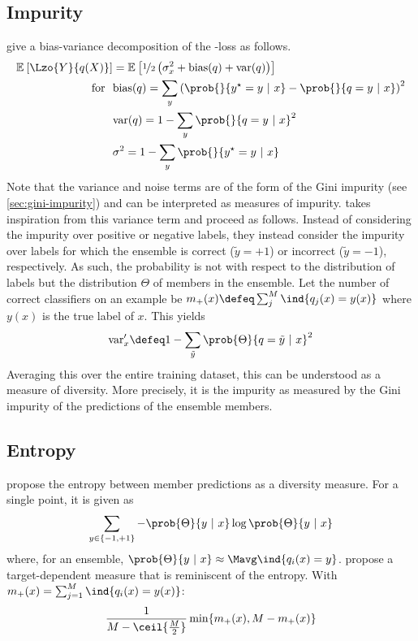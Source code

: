 \documentclass[../main.tex]{subfiles}
\begin{document}
\subsection{Impurity} 
\citeauthor{kohavi_BiasVarianceDecomposition_} \cite{kohavi_BiasVarianceDecomposition_} give a bias-variance decomposition of the \zeroone-loss as follows.
$$
\begin{align}
\mathbb{E}_{}\left[ \Lzo{Y}{q(X)} \right] &= 
\mathbb{E}_{}\left[  
\nicefrac{1}{2}\left( \sigma^2_{x} + \text{bias}(q) + \text{var}(q)   \right)
\right] \\
\text{for} ~ ~ & \text{bias}(q) =  \sum_{y} \left(  \prob{}{y^\star = y ~|~x} - \prob{}{q=y ~|~ x} \right)^2 \\
& \text{var}(q) = 1 - \sum_{y} \prob{}{q=y ~|~x}^2  \\
& \sigma^2 = 1 - \sum_{y} \prob{}{y^\star = y ~|~ x}
\end{align}
$$
Note that the variance and noise terms are of the form of the Gini impurity (see \ref{sec:gini-impurity}) and can be interpreted as measures of impurity.
\citeauthor{kuncheva_MeasuresDiversityClassifier_2003} \cite{kuncheva_MeasuresDiversityClassifier_2003} takes inspiration from this variance term and proceed as follows. Instead of considering the impurity over positive or negative labels, they instead consider the impurity over labels for which the ensemble is correct ($\tilde{y} = +1$) or incorrect ($\tilde{y} = -1$), respectively. As such, the probability is not with respect to the distribution of labels but the distribution $\Theta$ of members in the ensemble. Let the number of correct classifiers on an example be $m_{+}(x) \defeq \sum_{j}^M \ind{q_{j}(x) = y(x)}$ where $y(x)$ is the true label of $x$. This yields
$$
\text{var}'_{x} \defeq 1 - \sum_{\tilde{y}} \prob{\Theta}{q = \tilde{y} ~ |~ x}^2
$$
Averaging this over the entire training dataset, this can be understood as a measure of diversity. More precisely, it is the impurity as measured by the Gini impurity of the predictions of the ensemble members.

\subsection{Entropy}
\citeauthor{cunningham_DiversityQualityClassification_2000} \cite{cunningham_DiversityQualityClassification_2000}propose the entropy between member predictions as a diversity measure. For a single point, it is given as
$$
\sum_{y \in \{ -1, +1 \}} - \prob{\Theta}{y ~|~x} \log \prob{\Theta}{y~|~x}
$$
where, for an ensemble, $\prob{\Theta}{y~|~x} \approx \Mavg \ind{q_{i}(x) = y}$.
\citeauthor{shipp_RelationshipsCombinationMethods_2002} \cite{shipp_RelationshipsCombinationMethods_2002}propose a target-dependent measure that is reminiscent of the entropy. With $m_{+}(x) = \sum_{j=1}^M \ind{q_{i}(x) = y(x)}$:
$$
\frac{1}{M - \ceil{\frac{M}{2}}} \min \{ m_{+}(x), M-m_{+}(x) \}
$$
\end{document}
